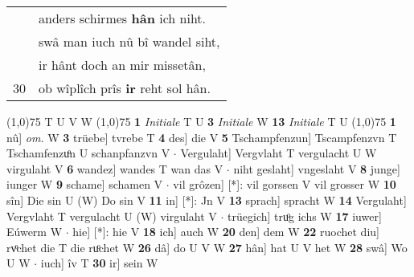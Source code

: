\documentclass[8pt,a4paper,notitlepage]{article}
\begin{document}
\begin{table}[ht]
\begin{minipage}[t]{0.5\linewidth}
\begin{tabular}{rl}
 & anders schirmes \textbf{hân} ich niht.\\ 
 & swâ man iuch nû bî wandel siht,\\ 
 & ir hânt doch an mir missetân,\\ 
30 & ob wîplîch prîs \textbf{ir} reht sol hân.\\ 
\end{tabular}
\scriptsize
\line(1,0){75} \newline
T U V W \newline
\line(1,0){75} \newline
\textbf{1} \textit{Initiale} T U  \textbf{3} \textit{Initiale} W  \textbf{13} \textit{Initiale} T U  \newline
\line(1,0){75} \newline
\textbf{1} nû] \textit{om.} W \textbf{3} trüebe] tvrebe T \textbf{4} des] die V \textbf{5} Tschampfenzun] Tscampfenzvn T Tschamfenzuͦn U schanpfanzvn V  $\cdot$ Vergulaht] Vergvlaht T vergulacht U W virgulaht V \textbf{6} wandez] wandes T wan das V  $\cdot$ niht geslaht] vngeslaht V \textbf{8} junge] iunger W \textbf{9} schame] schamen V  $\cdot$ vil grôzen] [*]: vil gorssen V vil grosser W \textbf{10} sîn] Die sin U (W) Do sin V \textbf{11} in] [*]: Jn V \textbf{13} sprach] spracht W \textbf{14} Vergulaht] Vergvlaht T vergulacht U (W) virgulaht V  $\cdot$ trüegich] truͦg ichs W \textbf{17} iuwer] Eúwerm W  $\cdot$ hie] [*]: hie V \textbf{18} ich] auch W \textbf{20} den] dem W \textbf{22} ruochet diu] rvͦchet die T die ruͦchet W \textbf{26} dâ] do U V W \textbf{27} hân] hat U V het W \textbf{28} swâ] Wo U W  $\cdot$ iuch] îv T \textbf{30} ir] sein W \newline
\end{minipage}
\end{table}
\end{document}
